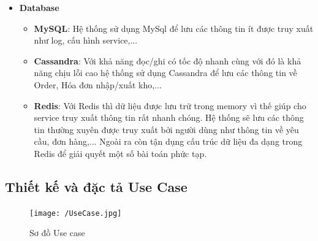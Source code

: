 \begin{itemize}
				\item \textbf{Database}
				\begin{itemize}
					\item \textbf{MySQL}: Hệ thống sử dụng MySql để lưu các thông tin ít được truy xuất như log, cấu hình service,...
					\item \textbf{Cassandra}: Với khả năng đọc/ghi có tốc độ nhanh cùng với đó là khả năng chịu lỗi cao hệ thống sử dụng Cassandra để lưu các thông tin về Order, Hóa đơn nhập/xuất kho,...
					\item \textbf{Redis}: Với Redis thì dữ liệu được lưu trữ trong memory vì thế giúp cho service truy xuất thông tin rất nhanh chóng. Hệ thống sẽ lưu các thông tin thường xuyên được truy xuất bởi người dùng như thông tin về yêu cầu, đơn hàng,... Ngoài ra còn tận dụng cấu trúc dữ liệu đa dạng trong Redis để giải quyết một số bài toán phức tạp. 
				\end{itemize}
		
		\end{itemize}

\newpage
\subsection{Thiết kế và đặc tả Use Case}

\begin{figure}[H]
	\texttt{[image: /UseCase.jpg]}
	\centering
	\linebreak
	\caption{Sơ đồ Use case}
\end{figure}

	\newpage
	
